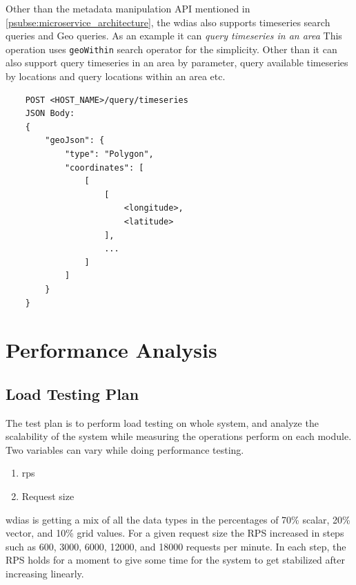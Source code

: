 \documentclass[conference]{IEEEtran}
\begin{document}
Other than the metadata manipulation API mentioned in \cref{psubse:microservice_architecture}, the \acrshort{wdias} also supports timeseries search queries and Geo queries. As an example it can \emph{query timeseries in an area} This operation uses \texttt{geoWithin} search operator for the simplicity. Other than it can also support query timeseries in an area by parameter, query available timeseries by locations and query locations within an area etc.
\begin{lstlisting}
    POST <HOST_NAME>/query/timeseries
    JSON Body:
    {
        "geoJson": {
            "type": "Polygon",
            "coordinates": [
                [
                    [
                        <longitude>,
                        <latitude>
                    ],
                    ...
                ]
            ]
        }
    }
\end{lstlisting}

\section{Performance Analysis}
\label{pse:performance_analysis}

\subsection{Load Testing Plan}
\label{psubse:test_plan}

The test plan is to perform load testing on whole system, and analyze the scalability of the system while measuring the operations perform on each module. Two variables can vary while doing performance testing.
\begin{enumerate}
    \item \acrfull{rps}
    \item Request size
\end{enumerate}

\acrshort{wdias} is getting a mix of all the data types in the percentages of 70\% scalar, 20\% vector, and 10\% grid values.
For a given request size the RPS increased in steps such as 600, 3000, 6000, 12000, and 18000 requests per minute. In each step, the RPS holds for a moment to give some time for the system to get stabilized after increasing linearly.

\end{document}
